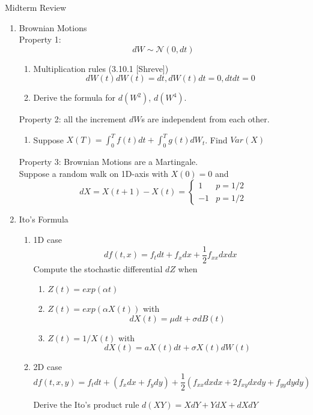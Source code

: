 \documentclass[12pt]{article}
\begin{document}
     
{\bf \centerline{\Large Midterm Review}}
\vskip0.5cm

\begin{enumerate}
\item Brownian Motions
\\
Property 1: 
\[
dW\sim\mathcal N(0,dt)
\]
\begin{enumerate}
\item Multiplication rules (3.10.1 [Shreve])
\[
dW(t)dW(t)=dt, dW(t)dt=0, dtdt=0
\]
\item Derive the formula for $d(W^2)$, $d(W^4)$.
\newpage
\end{enumerate}
Property 2: all the increment $dW$s are independent from each other.
\begin{enumerate}
\item Suppose $X(T)=\int_0^T f(t)dt + \int_0^T g(t)dW_t$. Find $Var(X)$
\end{enumerate}
\newpage
Property 3: Brownian Motions are a Martingale.
\\
Suppose a random walk on 1D-axis with $X(0)=0$ and 
\[
dX = X(t+1) -X(t) =
\begin{cases}
1 & p=1/2 \\
-1 & p=1/2
\end{cases}
\] 
\newpage
\item Ito's Formula
\\
\begin{enumerate}
\item 1D case
\[
df(t,x) = f_tdt+f_xdx + \frac12 f_{xx}dxdx
\]
 Compute the stochastic differential $dZ$ when 
\begin{enumerate}
\item $Z(t) = exp(\alpha t)$
\item $Z(t) = exp(\alpha X(t))$ with 
\[
dX(t) = \mu dt + \sigma dB(t)
\]
\item
$Z(t)=1/X(t)$ with 
\[
dX(t) = aX(t)dt + \sigma X(t) dW(t)
\]
\end{enumerate}
\item 2D case
\[
df(t,x,y) = f_tdt+(f_xdx+f_ydy) + \frac12( f_{xx}dxdx+2f_{xy}dxdy+f_{yy}dydy )
\]

Derive the Ito's product rule $d(XY)=XdY+YdX+dXdY$


\end{enumerate}
\end{enumerate}
\end{document}
